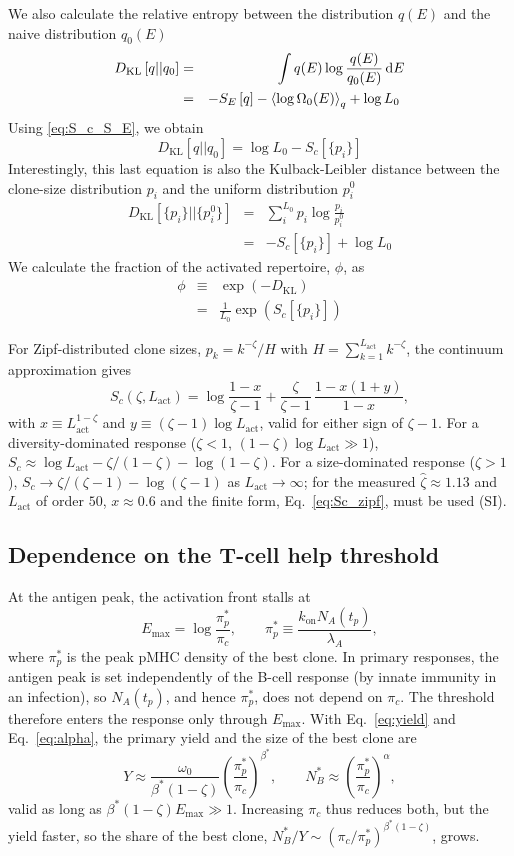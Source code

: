 \documentclass[aps, pre, twocolumn, 10pt, groupedaddress, superscriptaddress, linenumbers]{revtex4-2}
\newcommand{\EQ}{\begin{equation}}
\newcommand{\EE}{\end{equation}}
\newcommand{\EQA}{\begin{eqnarray}}
\newcommand{\EEA}{\end{eqnarray}}
\newcommand{\on}{\text{on}}
\newcommand{\act}{\text{act}}
\newcommand{\DG}{E}
\renewcommand{\d}{{\rm d}}
\newcommand{\lam}{\lambda}
\newcommand{\DKL}{D_{\mathrm{KL}}}
\begin{document}
We also calculate the relative entropy between the distribution $q(\DG)$ and the naive distribution $q_0(\DG)$
\EQA
\DKL\left[q||q_0\right] &=& \int q(\DG)\log \frac{q(\DG)}{q_0(\DG)} \, \d \DG\nonumber\\
&=& -S_\DG\left[q\right] - \left\langle \log\Omega_0(\DG)\right\rangle_{q} + \log L_0\nonumber\
\EEA
Using \ref{eq:S_c_S_E}, we obtain
\EQ
\DKL\left[q||q_0\right] = \log L_0 - S_c\left[\{p_i\}\right]
\EE
Interestingly, this last equation is also the Kulback-Leibler distance between the clone-size distribution $p_i$ and the uniform distribution $p_i^0$
\EQA
\DKL\left[\{p_i\}||\{p_i^0\}\right] &=& \sum_i^{L_0} p_i\log \frac{p_i}{p_i^0}\nonumber\\
&=& -S_c\left[\{p_i\}\right] + \log L_0
\EEA
We calculate the fraction of the activated repertoire, $\phi$, as
\EQA
\phi &\equiv& \exp\left(-\DKL\right)\nonumber\\ 
&=& \frac{1}{L_0}\exp\left(S_c\left[\{p_i\}\right]\right)
\EEA

For Zipf-distributed clone sizes, $p_k = k^{-\zeta}/H$ with $H = \sum_{k=1}^{L_\act} k^{-\zeta}$, the continuum approximation gives
\EQ
S_c(\zeta, L_\act) = \log\frac{1-x}{\zeta-1} + \frac{\zeta}{\zeta-1}\,\frac{1-x(1+y)}{1-x},
\label{eq:Sc_zipf}
\EE
with $x \equiv L_\act^{1-\zeta}$ and $y \equiv (\zeta-1)\log L_\act$, valid for either sign of $\zeta - 1$.
For a diversity-dominated response ($\zeta < 1$, $(1-\zeta)\log L_\act \gg 1$), $S_c \approx \log L_\act - \zeta/(1-\zeta) - \log(1-\zeta)$.
For a size-dominated response ($\zeta > 1$), $S_c \to \zeta/(\zeta-1) - \log(\zeta-1)$ as $L_\act \to \infty$; for the measured $\hat\zeta \approx 1.13$ and $L_\act$ of order $50$, $x \approx 0.6$ and the finite form, Eq.~\ref{eq:Sc_zipf}, must be used (SI).


\subsection*{Dependence on the T-cell help threshold}

At the antigen peak, the activation front stalls at
\EQ
\DG_{\max} = \log\frac{\pi_p^*}{\pi_c}, \qquad \pi_p^* \equiv \frac{k_\on N_A(t_p)}{\lam_A},
\label{eq:Emax_pic}
\EE
where $\pi_p^*$ is the peak pMHC density of the best clone.
In primary responses, the antigen peak is set independently of the B-cell response (by innate immunity in an infection), so $N_A(t_p)$, and hence $\pi_p^*$, does not depend on $\pi_c$.
The threshold therefore enters the response only through $\DG_{\max}$.
With Eq.~\ref{eq:yield} and Eq.~\ref{eq:alpha}, the primary yield and the size of the best clone are
\EQ
Y \approx \frac{\omega_0}{\beta^*(1-\zeta)} \left(\frac{\pi_p^*}{\pi_c}\right)^{\beta^*}, \qquad
N_B^* \approx \left(\frac{\pi_p^*}{\pi_c}\right)^{\alpha},
\EE
valid as long as $\beta^*(1-\zeta)\DG_{\max} \gg 1$.
Increasing $\pi_c$ thus reduces both, but the yield faster, so the share of the best clone, $N_B^*/Y \sim (\pi_c/\pi_p^*)^{\beta^*(1-\zeta)}$, grows.
\end{document}
